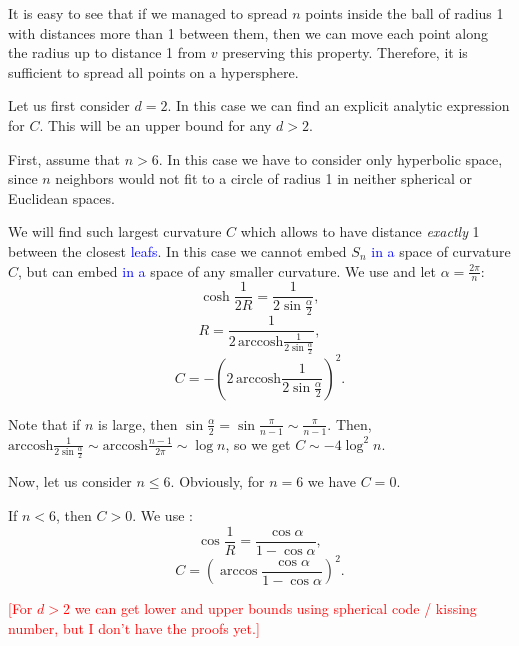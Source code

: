 \documentclass{article} %
\newcommand{\ph}[1]{\textcolor{blue}{#1}}
\begin{document}
It is easy to see that if we managed to spread $n$ points inside the ball of radius 1 with distances more than 1 between them, then we can move each point along the radius up to distance 1 from $v$ preserving this property. Therefore, it is sufficient to spread all points on a hypersphere. 

Let us first consider $d = 2$. In this case we can find an explicit analytic expression for $C$. This will be an upper bound for any $d>2$.

First, assume that $n > 6$. In this case we have to consider only hyperbolic space, since $n$ neighbors would not fit to a circle of radius 1 in neither spherical or Euclidean spaces.

We will find such largest curvature $C$ which allows to have distance \textit{exactly} 1 between the closest \ph{leafs}. In this case we cannot embed $S_n$ \ph{in a} space of curvature $C$, but can embed \ph{in a} space of any smaller curvature. 
We use  and let $\alpha = \frac{2\pi}{n}$:
\[
\cosh\frac{1}{2R} = \frac{1}{2\sin \frac{\alpha}{2}},
\]
\[
R = \frac{1}{2\,\textrm{arccosh}\frac{1}{2\sin \frac{\alpha}{2}}},
\]
\[
C = - \left(2\,\textrm{arccosh}\frac{1}{2\sin \frac{\alpha}{2}}\right)^2.
\]

Note that if $n$ is large, then $\sin \frac{\alpha}{2} = \sin\frac{\pi}{n-1} \sim \frac{\pi}{n-1}$. Then,  $\textrm{arccosh}\frac{1}{2\sin \frac{\alpha}{2}} \sim \textrm{arccosh}\frac{n-1}{2\pi} \sim \log n$, so we get $C \sim - 4 \log^2 n$. 

Now, let us consider $n \le 6$. Obviously, for $n = 6$ we have $C = 0$.

If $n < 6$, then $C > 0$. We use :
\[
\cos{\frac{1}{R}} = \frac{\cos \alpha}{1 - \cos \alpha},
\]
\[
C = \left(\arccos \frac{\cos \alpha}{1 - \cos \alpha}\right)^2.
\]

\textcolor{red}{[For $d> 2$ we can get lower and upper bounds using spherical code / kissing number, but I don't have the proofs yet.]} 

\end{document}
